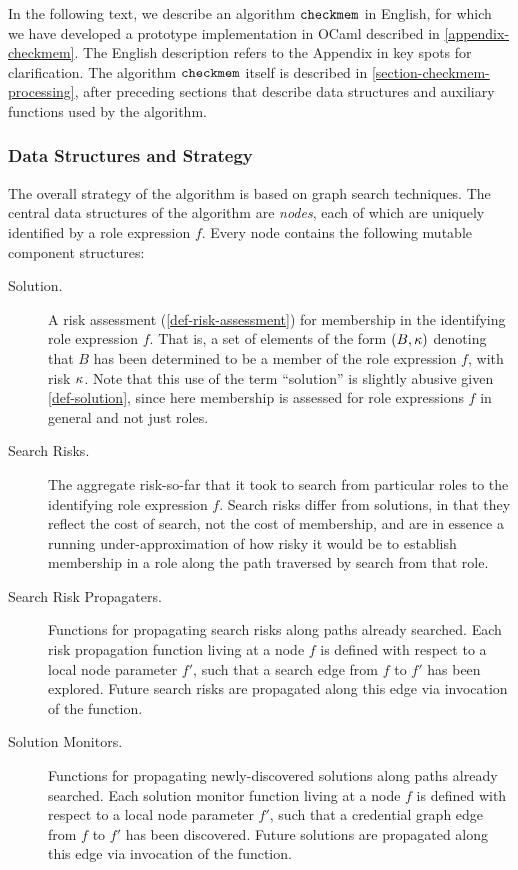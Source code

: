 In the following text, we describe an algorithm $\texttt{checkmem}$ in
English, for which we have developed a prototype implementation in
OCaml described in \autoref{appendix-checkmem}.  The English
description refers to the Appendix in key spots for clarification.
The algorithm $\texttt{checkmem}$ itself is described in
\autoref{section-checkmem-processing}, after preceding 
sections that describe data structures and auxiliary functions
used by the algorithm.

\subsubsection{Data Structures and Strategy}

The overall strategy of the algorithm is based on graph search
techniques.  The central data structures of the algorithm are
\emph{nodes}, each of which are uniquely identified by a role
expression $f$.  Every node contains the following mutable component
structures:
\begin{description}
\item[Solution.] A risk assessment (\autoref{def-risk-assessment}) for
membership in the identifying role expression $f$.  That is, a set of
elements of the form $(B, \kappa)$ denoting that $B$ has been
determined to be a member of the role expression $f$, with risk
$\kappa$.  Note that this use of the term ``solution'' is slightly
abusive given \autoref{def-solution}, since here membership is
assessed for role expressions $f$ in general and not just roles.
\item[Search Risks.] The aggregate risk-so-far that it took to search
from particular roles to the identifying role expression $f$.  Search
risks differ from solutions, in that they reflect the cost of search,
not the cost of membership, and are in essence a running
under-approximation of how risky it would be to establish membership
in a role along the path traversed by search from that role.
\item[Search Risk Propagaters.] Functions for propagating search risks
along paths already searched.  Each risk propagation function living
at a node $f$ is defined with respect to a local node
parameter $f'$, such that a search edge from $f$ to $f'$ has been
explored.  Future search risks are propagated along this edge via
invocation of the function.
\item[Solution Monitors.] Functions for propagating newly-discovered
solutions along paths already searched.  Each solution monitor
function living at a node $f$ is defined with respect to a local node
parameter $f'$, such that a credential graph edge from $f$ to $f'$ has
been discovered.  Future solutions are propagated along this edge via
invocation of the function.
\end{description}  
